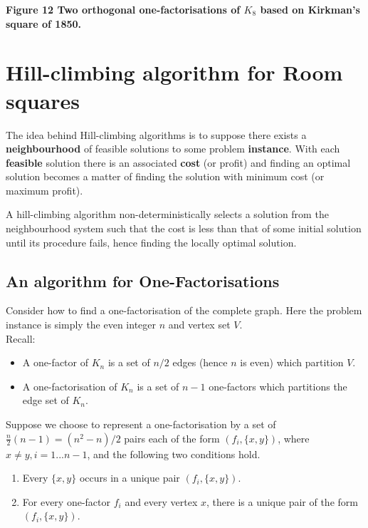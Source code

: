 \documentclass[
  12pt,
  a4paper]{book}
\begin{document}
\textbf{Figure 12 Two orthogonal one-factorisations of \(K_8\) based on
Kirkman's square of 1850.}

\hypertarget{hill-climbing-algorithm-for-room-squares}{%
\section{Hill-climbing algorithm for Room
squares}\label{hill-climbing-algorithm-for-room-squares}}

The idea behind Hill-climbing algorithms is to suppose there exists a
\textbf{neighbourhood} of feasible solutions to some problem
\textbf{instance}. With each \textbf{feasible} solution there is an
associated \textbf{cost} (or profit) and finding an optimal solution
becomes a matter of finding the solution with minimum cost (or maximum
profit).

A hill-climbing algorithm non-deterministically selects a solution from
the neighbourhood system such that the cost is less than that of some
initial solution until its procedure fails, hence finding the locally
optimal solution.

\hypertarget{an-algorithm-for-one-factorisations}{%
\subsection{An algorithm for
One-Factorisations}\label{an-algorithm-for-one-factorisations}}

Consider how to find a one-factorisation of the complete graph. Here the
problem instance is simply the even integer \(n\) and vertex set
\(V\).\\
Recall:

\begin{itemize}
\item
  A one-factor of \(K_n\) is a set of \(n/2\) edges (hence \(n\) is
  even) which partition \(V\).
\item
  A one-factorisation of \(K_n\) is a set of \(n-1\) one-factors which
  partitions the edge set of \(K_n\).
\end{itemize}

Suppose we choose to represent a one-factorisation by a set of
\(\frac{n}{2}(n-1)=(n^2-n)/2\) pairs each of the form \((f_i,\{x,y\})\),
where \(x \neq y, i=1...n-1\), and the following two conditions hold.

\begin{enumerate}
\def\labelenumi{\arabic{enumi}.}
\item
  Every \(\{x,y\}\) occurs in a unique pair \((f_i,\{x,y\})\).
\item
  For every one-factor \(f_i\) and every vertex \(x\), there is a unique
  pair of the form \((f_i,\{x,y\})\).
\end{enumerate}
\end{document}
